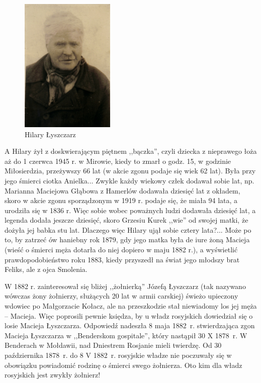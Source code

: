 \begin{figure}[!h]
\begin{center}
\includegraphics[width=0.4\textwidth]{zdjecia/hilary_lyszczarz.jpg}
\caption{Hilary Łyszczarz}
\label{rys:hilary_lyszczarz}
\end{center}
\end{figure}

A Hilary żył z doskwierającym piętnem ,,bączka'', czyli dziecka z nieprawego łoża aż do 1 czerwca 1945 r. w Mirowie, kiedy to zmarł o godz. 15, w godzinie Miłosierdzia, przeżywszy 66 lat (w akcie zgonu podaje się wiek 62 lat). Była przy jego śmierci ciotka Anielka... Zwykle każdy wiekowy człek dodawał sobie lat, np. Marianna Maciejowa Głąbowa z Hamerlów dodawała dziesięć lat z okładem, skoro w akcie zgonu sporządzonym w 1919 r. podaje się, że miała 94 lata, a urodziła się w 1836 r. Więc sobie  wobec poważnych ludzi dodawała dziesięć lat, a legenda dodała jeszcze dziesięć, skoro Grzesiu Kurek ,,wie'' od swojej matki, że dożyła jej babka stu lat. Dlaczego więc Hilary ujął sobie cztery lata?... Może po to, by zatrzeć ów haniebny rok 1879, gdy jego matka była de iure żoną Macieja (wieść o śmierci męża dotarła do niej dopiero w maju 1882 r.), a wyświetlić prawdopodobieństwo roku 1883, kiedy przyszedł na świat jego młodszy brat Feliks, ale z ojca Smolenia.

W 1882 r. zainteresował się bliżej ,,żołnierką'' Józefą Łyszczarz (tak nazywano wówczas żony żołnierzy, służących 20 lat w armii carskiej) świeżo upieczony wdowiec po Małgorzacie Kołacz, ale na przeszkodzie stał niewiadomy los jej męża -- Macieja. Więc poprosili pewnie księdza, by u władz rosyjskich dowiedział się o losie Macieja Łyszczarza. Odpowiedź nadeszła 8 maja 1882~r. stwierdzająca zgon Macieja Łyszczarza w ,,Benderskom gospitale'', który nastąpił 30 X 1878~r. W Benderach w Mołdawii, nad Dniestrem Rosjanie mieli twierdzę. Od 30 października 1878~r. do 8 V 1882~r. rosyjskie władze nie poczuwały się w obowiązku powiadomić rodzinę o śmierci swego żołnierza. Oto kim dla władz rosyjskich jest zwykły żołnierz!


